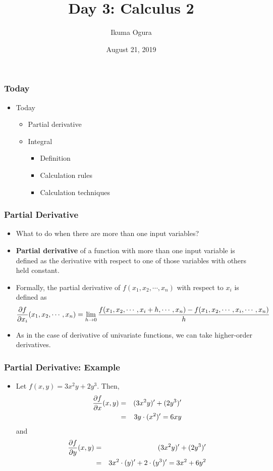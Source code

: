\documentclass[pdflatex, 12pt]{beamer}
\title[Math Camp: Day 3]{Day 3: Calculus 2}
\author[Ikuma Ogura]{Ikuma Ogura}
\institute[Georgetown]{Ph.D. student, Department of Government, Georgetown University}
\date[August 21, 2019]{August 21, 2019}
\begin{document}
\begin{frame}
\frametitle{}
\titlepage
\end{frame}

\begin{frame}
\frametitle{Today}
\begin{itemize}
\item Today
 \begin{itemize}
 \item Partial derivative
 \item Integral
  \begin{itemize}
  \item Definition
  \item Calculation rules
  \item Calculation techniques
  \end{itemize}
 \end{itemize}
\end{itemize}
\end{frame}

\begin{frame}
\frametitle{Partial Derivative}
\begin{itemize}
\item What to do when there are more than one input variables?
\vspace{0.4cm}
\item \textbf{Partial derivative} of a function with more than one input variable is defined as the derivative with respect to one of those variables with others held constant.
\vspace{0.4cm}
\item Formally, the partial derivative of $f(x_1, x_2, \cdots, x_n)$ with respect to $x_i$ is defined as
 {\scriptsize
 \begin{equation} 
 \frac{\partial f}{\partial x_i} (x_1, x_2, \cdots, x_n) = \lim_{h \to 0} \frac{f(x_1, x_2, \cdots, x_i + h, \cdots, x_n) - f(x_1, x_2, \cdots, x_i, \cdots, x_n)}{h} \notag
 \end{equation}  
 }
\vspace{0.2cm}
\item As in the case of derivative of univariate functions, we can take higher-order derivatives. 
\end{itemize}
\end{frame}

\begin{frame}
\frametitle{Partial Derivative: Example}
\begin{itemize}
\item Let $f(x, y) = 3x^2y + 2y^3$. Then,
 \begin{eqnarray}
 \frac{\partial f}{\partial x}(x, y) &=& (3x^2y)' + (2y^3)' \notag \\
 &=& 3y \cdot (x^2)' = 6xy \notag 
 \end{eqnarray}
 and 
 \begin{eqnarray}
 \frac{\partial f}{\partial y}(x, y) &=& (3x^2y)' + (2y^3)' \notag \\
 &=& 3x^2 \cdot (y)' + 2 \cdot (y^3)' = 3x^2 + 6y^2 \notag 
 \end{eqnarray}
\end{itemize}
\end{frame}
\end{document}
